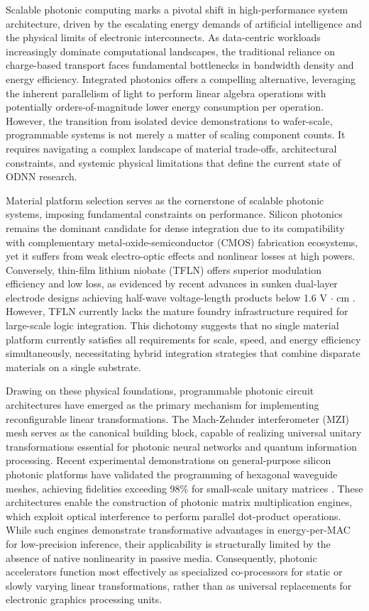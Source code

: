 \documentclass[11pt]{article}
\begin{document}
Scalable photonic computing marks a pivotal shift in high-performance system architecture, driven by the escalating energy demands of artificial intelligence and the physical limits of electronic interconnects. As data-centric workloads increasingly dominate computational landscapes, the traditional reliance on charge-based transport faces fundamental bottlenecks in bandwidth density and energy efficiency. Integrated photonics offers a compelling alternative, leveraging the inherent parallelism of light to perform linear algebra operations with potentially orders-of-magnitude lower energy consumption per operation. However, the transition from isolated device demonstrations to wafer-scale, programmable systems is not merely a matter of scaling component counts. It requires navigating a complex landscape of material trade-offs, architectural constraints, and systemic physical limitations that define the current state of ODNN research.

Material platform selection serves as the cornerstone of scalable photonic systems, imposing fundamental constraints on performance. Silicon photonics remains the dominant candidate for dense integration due to its compatibility with complementary metal-oxide-semiconductor (CMOS) fabrication ecosystems, yet it suffers from weak electro-optic effects and nonlinear losses at high powers. Conversely, thin-film lithium niobate (TFLN) offers superior modulation efficiency and low loss, as evidenced by recent advances in sunken dual-layer electrode designs achieving half-wave voltage-length products below 1.6 V \(\cdot\) cm \citep{doi_10_3390_photonics12111129_03f4b6cd}. However, TFLN currently lacks the mature foundry infrastructure required for large-scale logic integration. This dichotomy suggests that no single material platform currently satisfies all requirements for scale, speed, and energy efficiency simultaneously, necessitating hybrid integration strategies that combine disparate materials on a single substrate.

Drawing on these physical foundations, programmable photonic circuit architectures have emerged as the primary mechanism for implementing reconfigurable linear transformations. The Mach-Zehnder interferometer (MZI) mesh serves as the canonical building block, capable of realizing universal unitary transformations essential for photonic neural networks and quantum information processing. Recent experimental demonstrations on general-purpose silicon photonic platforms have validated the programming of hexagonal waveguide meshes, achieving fidelities exceeding 98\% for small-scale unitary matrices \citep{doi_10_1063_5_0235712_fb28986d}. These architectures enable the construction of photonic matrix multiplication engines, which exploit optical interference to perform parallel dot-product operations. While such engines demonstrate transformative advantages in energy-per-MAC for low-precision inference, their applicability is structurally limited by the absence of native nonlinearity in passive media. Consequently, photonic accelerators function most effectively as specialized co-processors for static or slowly varying linear transformations, rather than as universal replacements for electronic graphics processing units.
\end{document}
